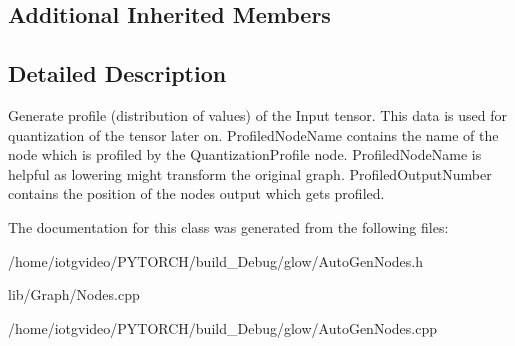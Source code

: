 \subsection*{Additional Inherited Members}


\subsection{Detailed Description}
Generate profile (distribution of values) of the Input tensor. This data is used for quantization of the tensor later on. Profiled\+Node\+Name contains the name of the node which is profiled by the Quantization\+Profile node. Profiled\+Node\+Name is helpful as lowering might transform the original graph. Profiled\+Output\+Number contains the position of the node\textquotesingle{}s output which gets profiled. 

The documentation for this class was generated from the following files\+:\begin{DoxyCompactItemize}
\item 
/home/iotgvideo/\+P\+Y\+T\+O\+R\+C\+H/build\+\_\+\+Debug/glow/Auto\+Gen\+Nodes.\+h\item 
lib/\+Graph/Nodes.\+cpp\item 
/home/iotgvideo/\+P\+Y\+T\+O\+R\+C\+H/build\+\_\+\+Debug/glow/Auto\+Gen\+Nodes.\+cpp\end{DoxyCompactItemize}
